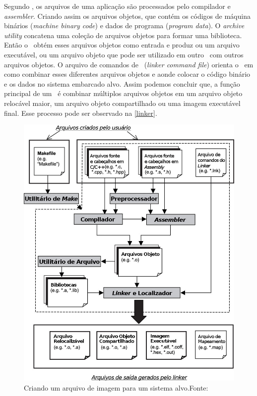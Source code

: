 Segundo , os arquivos de uma aplicação são processados pelo compilador e \textit{assembler}. Criando assim os arquivos objetos, que contém os códigos de máquina binários (\textit{machine binary code}) e dados de programa (\textit{program data}). O \textit{archive utility} concatena uma coleção de arquivos objetos para formar uma biblioteca. Então o \linker\ obtém esses arquivos objetos como entrada e produz ou um arquivo executável, ou um arquivo objeto que pode ser utilizado em outro \linker\ com outros arquivos objetos. O arquivo de comandos de \linker\ (\textit{linker command file}) orienta o \linker\ em como combinar esses diferentes arquivos objetos e aonde colocar o código binário e os dados no sistema embarcado alvo. Assim podemos concluir que, a função principal de um \linker\ é combinar múltiplos arquivos objetos em um arquivo objeto relocável maior, um arquivo objeto compartilhado ou uma imagem executável final. Esse processo pode ser observado na \autoref{linker}.

\begin{figure}[H]
    \scriptsize
     \centering
     \includegraphics[scale=0.5]{dados/figuras/Linker.png}
     \caption{Criando um arquivo de imagem para um sistema alvo.\newline Fonte:\cite{Qing2003}}
     \label{linker}
\end{figure}

